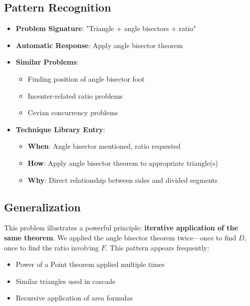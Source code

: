 \documentclass[12pt]{article}
\begin{document}
\subsection*{Pattern Recognition}
\begin{itemize}[leftmargin=*]
    \item \textbf{Problem Signature}: "Triangle + angle bisectors + ratio"
    
    \item \textbf{Automatic Response}: Apply angle bisector theorem
    
    \item \textbf{Similar Problems}:
    \begin{itemize}
        \item Finding position of angle bisector foot
        \item Incenter-related ratio problems
        \item Cevian concurrency problems
    \end{itemize}
    
    \item \textbf{Technique Library Entry}:
    \begin{itemize}
        \item \textbf{When}: Angle bisector mentioned, ratio requested
        \item \textbf{How}: Apply angle bisector theorem to appropriate triangle(s)
        \item \textbf{Why}: Direct relationship between sides and divided segments
    \end{itemize}
\end{itemize}

\subsection*{Generalization}
This problem illustrates a powerful principle: \textbf{iterative application of the same theorem}. We applied the angle bisector theorem twice—once to find $D$, once to find the ratio involving $F$. This pattern appears frequently:

\begin{itemize}[leftmargin=*]
    \item Power of a Point theorem applied multiple times
    \item Similar triangles used in cascade
    \item Recursive application of area formulas
\end{itemize}
\end{document}
